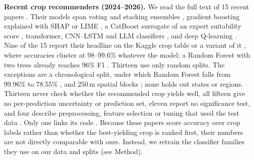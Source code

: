
\textbf{Recent crop recommenders (2024--2026).} We read the full text of 15 recent papers
\cite{dey2024,senapaty2024,sam2025,ahmed2025,afzal2025,shastri2025,singh2025,gunasekaran2025,bakr2025,piyar2026,mahesh2026,latha2026,reddy2026,sharma2026,pandey2026}. Their models span voting and stacking ensembles \cite{ahmed2025,afzal2025,gunasekaran2025},
gradient boosting explained with SHAP or LIME \cite{shastri2025,sharma2026}, a CatBoost surrogate of an expert
suitability score \cite{mahesh2026}, transformer, CNN--LSTM and LLM classifiers \cite{bakr2025,piyar2026,latha2026,pandey2026},
and deep Q-learning \cite{reddy2026}. Nine of the 15 report their headline on the Kaggle crop table
\cite{ingle2020kaggle} or a variant of it \cite{dey2024,ahmed2025,afzal2025,shastri2025,gunasekaran2025,bakr2025,piyar2026,latha2026,pandey2026}, where accuracies cluster at 98--99.6\% whatever the model;
a Random Forest with two trees already reaches 96\% F1 \cite{afzal2025}. Thirteen use only random
splits. The exceptions are a chronological split, under which Random Forest falls from 99.96\% to 78.55\% \cite{sam2025},
and 250\,m spatial blocks \cite{reddy2026}; none holds out states or regions. Thirteen never check whether
the recommended crop yields well, all fifteen give no per-prediction uncertainty or prediction set,
eleven report no significance test, and four describe preprocessing, feature
selection or tuning that used the test data \cite{singh2025,piyar2026,latha2026,reddy2026}. Only one links its code
\cite{reddy2026}. Because these papers score accuracy over crop labels rather than whether the best-yielding crop
is ranked first, their numbers are not directly comparable with ours. Instead, we retrain the classifier families they use
on our data and splits (see Method).
